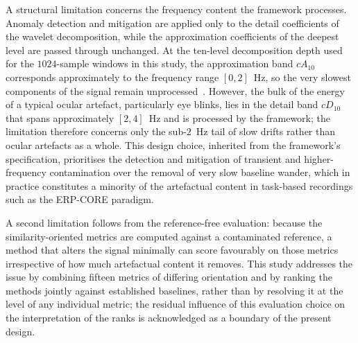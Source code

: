 \documentclass[MScCS,12pt,oneside,final]{uccthesis}
\begin{document}
A structural limitation concerns the frequency content the framework processes. Anomaly detection and mitigation are applied only to the detail coefficients of the wavelet decomposition, while the approximation coefficients of the deepest level are passed through unchanged. At the ten-level decomposition depth used for the $1024$-sample windows in this study, the approximation band $cA_{10}$ corresponds approximately to the frequency range $[0, 2]$~Hz, so the very slowest components of the signal remain unprocessed~\parencite{longo2025oneegwavelad}. However, the bulk of the energy of a typical ocular artefact, particularly eye blinks, lies in the detail band $cD_{10}$ that spans approximately $[2, 4]$~Hz and is processed by the framework; the limitation therefore concerns only the sub-$2$~Hz tail of slow drifts rather than ocular artefacts as a whole. This design choice, inherited from the framework's specification, prioritises the detection and mitigation of transient and higher-frequency contamination over the removal of very slow baseline wander, which in practice constitutes a minority of the artefactual content in task-based recordings such as the ERP-CORE paradigm.

A second limitation follows from the reference-free evaluation: because the similarity-oriented metrics are computed against a contaminated reference, a method that alters the signal minimally can score favourably on those metrics irrespective of how much artefactual content it removes. This study addresses the issue by combining fifteen metrics of differing orientation and by ranking the methods jointly against established baselines, rather than by resolving it at the level of any individual metric; the residual influence of this evaluation choice on the interpretation of the ranks is acknowledged as a boundary of the present design.
\end{document}

